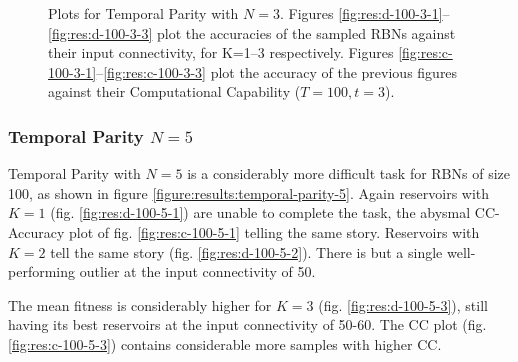 \begin{figure*}[!t]
  \centering
  \resizebox{\textwidth}{!}{
    \subfloat[K=1]{
      
      \label{fig:res:d-100-3-1}
    }
    \subfloat[K=2]{
      
      \label{fig:res:d-100-3-2}
    }
    \subfloat[K=3]{
      
      \label{fig:res:d-100-3-3}
    }
  }

  \caption{
    Plots for Temporal Parity with $N=3$.
    Figures \ref{fig:res:d-100-3-1}–\ref{fig:res:d-100-3-3} plot the accuracies of the sampled RBNs against their input connectivity,
    for K=1–3 respectively.
    Figures \ref{fig:res:c-100-3-1}–\ref{fig:res:c-100-3-3} plot the accuracy of the previous figures against their Computational Capability ($T=100, t=3$).
  }
  \label{figure:results:temporal-parity-3}
\end{figure*}

\subsubsection{Temporal Parity $N=5$}

Temporal Parity with $N=5$ is a considerably more difficult task for RBNs of size 100,
as shown in figure \ref{figure:results:temporal-parity-5}.
Again reservoirs with $K=1$ (fig. \ref{fig:res:d-100-5-1}) are unable to complete the task,
the abysmal CC-Accuracy plot of fig. \ref{fig:res:c-100-5-1} telling the same story.
Reservoirs with $K=2$ tell the same story (fig. \ref{fig:res:d-100-5-2}).
There is but a single well-performing outlier at the input connectivity of 50.

The mean fitness is considerably higher for $K=3$ (fig. \ref{fig:res:d-100-5-3}),
still having its best reservoirs at the input connectivity of 50-60.
The CC plot (fig. \ref{fig:res:c-100-5-3}) contains considerable more samples with higher CC.


